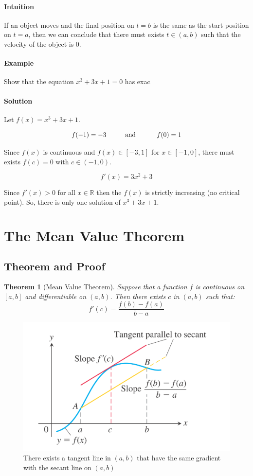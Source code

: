 \documentclass[12pt]{article}
\newcommand\tab[1][1cm]{\hspace*{#1}}
\newtheorem{theorem}{Theorem}
\begin{document}
\paragraph{Intuition}
If an object moves and the final position on $t = b$ is the same as the start position on $t = a$, then we can conclude that
there must exists $t \in (a, b)$ such that the velocity of the object is 0.

\paragraph{Example}
Show that the equation $x^3 + 3x + 1 = 0$ has exac

\paragraph{Solution}
Let $f(x) = x^3 + 3x + 1$.

\[
  f(-1) = - 3 \textrm{\tab and \tab} f(0) = 1  
\]

Since $f(x)$ is continuous and $f(x) \in [-3, 1]$ for $x \in [-1, 0]$, there must
exists $f(c) = 0$ with $c \in (-1, 0)$.

\[
    f'(x) = 3x^2 + 3
\]

Since $f'(x) > 0$ for all $x \in \mathbb{R}$ then the $f(x)$ is strictly increasing 
(no critical point). So, there is only one solution of $x^3 +3x + 1$.

\section{The Mean Value Theorem}
\subsection{Theorem and Proof}
\begin{theorem}[Mean Value Theorem]
    Suppose that a function $f$ is continuous on $[a, b]$ and differentiable on $(a, b)$. 
    Then there exists $c$ in $(a, b)$ such that:
    \[
        f'(c) = \frac{f(b) - f(a)}{b - a} 
    \]
\end{theorem}

\begin{figure}[h!]
     \centering
     \includegraphics[width = 0.5\linewidth]{Images/mvt.png}
     \caption{There exists a tangent line in $(a, b)$ that have the same gradient
     with the secant line on $(a, b)$}
\end{figure}
\end{document}
